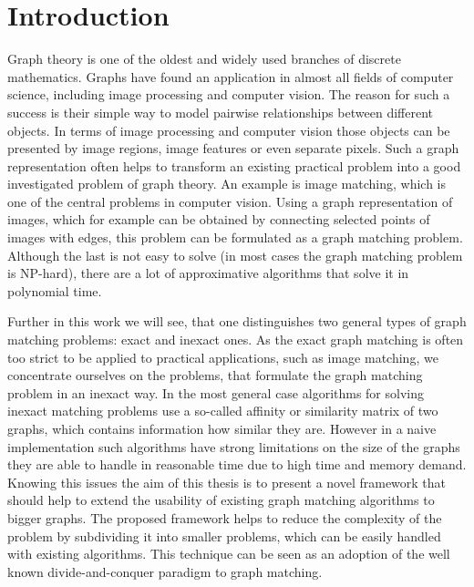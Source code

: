\chapter{Introduction}
Graph theory is one of the oldest and widely used branches of discrete mathematics. Graphs have found an application in almost all fields of computer science, including image processing and computer vision. The reason for such a success is their simple way to model pairwise relationships between different objects. In terms of image processing and computer vision those objects can be presented by image regions, image features or even separate pixels. Such a graph representation often helps to transform an existing practical problem into a good investigated problem of graph theory. An example is image matching, which is one of the central problems in computer vision. %
Using a graph representation of images, which for example can be obtained by connecting selected points of images with edges, this problem can be formulated as a graph matching problem. Although the last is not easy to solve (in most cases the graph matching problem is NP-hard), there are a lot of approximative algorithms that solve it in polynomial time.

Further in this work we will see, that one distinguishes two general types of graph matching problems: exact and inexact ones. As the exact graph matching is often too strict to be applied to practical applications, such as image matching, we concentrate ourselves on the problems, that formulate the graph matching problem in an inexact way.
In the most general case algorithms for solving inexact matching problems use a so-called affinity or similarity matrix of two graphs, which contains information how similar they are.
However in a naive implementation such algorithms have strong limitations on the size of the graphs they are able to handle in reasonable time due to high time and memory demand. Knowing this issues the aim of this thesis is to present a novel framework that should help to extend the usability of existing graph matching algorithms to bigger graphs. The proposed framework helps to reduce the complexity of the problem by subdividing it into smaller problems, which can be easily handled with existing algorithms. This technique can be seen as an adoption of the well known divide-and-conquer paradigm to graph matching.

